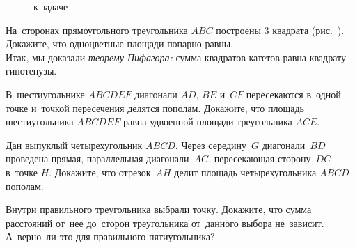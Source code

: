\begin{problems}
\begin{figure}[ht]
\begin{center}
    \caption{к задаче~}
\end{center}
\end{figure}

\item{}
На~сторонах прямоугольного треугольника $ABC$ построены 3 квадрата
(рис.~).
Докажите, что одноцветные площади попарно равны.
\\
Итак, мы доказали \emph{теорему Пифагора:} сумма квадратов катетов равна
квадрату гипотенузы.

\item
В~шестиугольнике $ABCDEF$ диагонали $AD$, $BE$ и~$CF$ пересекаются
в~одной точке и~точкой пересечения делятся пополам.
Докажите, что площадь шестиугольника $ABCDEF$ равна удвоенной площади
треугольника $ACE$.

\item
Дан выпуклый четырехугольник $ABCD$.
Через середину~$G$ диагонали~$BD$ проведена прямая, параллельная
диагонали~$AC$, пересекающая сторону~$DC$ в~точке $H$.
Докажите, что отрезок~$AH$ делит площадь четырехугольника $ABCD$ пополам.




\item
Внутри правильного треугольника выбрали точку.
Докажите, что сумма расстояний от~нее до~сторон треугольника от~данного выбора
не~зависит.
А~верно~ли это для правильного пятиугольника?



\end{problems}
